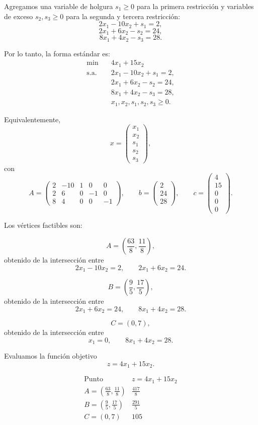 Agregamos una variable de holgura \(s_1\geq 0\) para la primera restricción
y variables de exceso \(s_2,s_3\geq 0\) para la segunda y tercera restricción:
\[
2x_1-10x_2+s_1=2,
\]
\[
2x_1+6x_2-s_2=24,
\]
\[
8x_1+4x_2-s_3=28.
\]

Por lo tanto, la forma estándar es:
\[
\begin{aligned}
\min \quad & 4x_1+15x_2\\
\text{s.a.}\quad
& 2x_1-10x_2+s_1=2,\\
& 2x_1+6x_2-s_2=24,\\
& 8x_1+4x_2-s_3=28,\\
& x_1,x_2,s_1,s_2,s_3\geq 0.
\end{aligned}
\]

Equivalentemente,
\[
x=
\begin{pmatrix}
x_1\\
x_2\\
s_1\\
s_2\\
s_3
\end{pmatrix},
\]
con
\[
A=
\begin{pmatrix}
2 & -10 & 1 & 0 & 0\\
2 & 6 & 0 & -1 & 0\\
8 & 4 & 0 & 0 & -1
\end{pmatrix},
\qquad
b=
\begin{pmatrix}
2\\
24\\
28
\end{pmatrix},
\qquad
c=
\begin{pmatrix}
4\\
15\\
0\\
0\\
0
\end{pmatrix}.
\]

Los vértices factibles son:

\[
A=\left(\frac{63}{8},\frac{11}{8}\right),
\]
obtenido de la intersección entre
\[
2x_1-10x_2=2,
\qquad
2x_1+6x_2=24.
\]

\[
B=\left(\frac{9}{5},\frac{17}{5}\right),
\]
obtenido de la intersección entre
\[
2x_1+6x_2=24,
\qquad
8x_1+4x_2=28.
\]

\[
C=(0,7),
\]
obtenido de la intersección entre
\[
x_1=0,
\qquad
8x_1+4x_2=28.
\]

Evaluamos la función objetivo
\[
z=4x_1+15x_2.
\]

\[
\begin{array}{c|c}
\text{Punto} & z=4x_1+15x_2 \\ \hline
A=\left(\frac{63}{8},\frac{11}{8}\right) 
& \frac{417}{8} \\[2mm]
B=\left(\frac{9}{5},\frac{17}{5}\right)
& \frac{291}{5} \\[2mm]
C=(0,7)
& 105
\end{array}
\]

